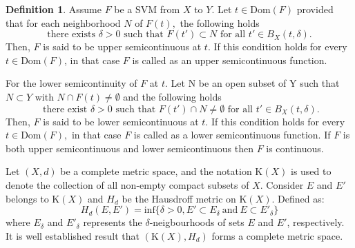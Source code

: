 \documentclass[12pt,oneside,reqno]{amsart}
\theoremstyle{definition}
\newtheorem{definition}[theorem]{Definition}
\theoremstyle{remark}
\begin{document}
 \begin{definition}\cite{Aubin}
 Assume $F $ be a SVM from $X$ to $Y$. Let $t \in \text{Dom}(F)$ provided that for each neighborhood $N$ of $F(t),$ the following holds
 \begin{equation}\label{uppersemi}
 \text{there exists } \delta > 0  \text{ such that } F(t') \subset N \text{ for all } t' \in B_X(t, \delta).
 \end{equation}
 Then, $F$ is said to be upper semicontinuous at $t$. If this condition holds for every $t\in \text{Dom}(F)$, in that case $F$ is called as an upper semicontinuous function.
 
 For the lower semicontinuity of $F$ at $t$. Let N be an open subset of Y such that $N\subset Y$ with $N\cap F(t) \neq \emptyset $ and the following holds 
 \[ \text{ there exist } \delta >0 \text{ such that } F(t') \cap N \neq \emptyset \text{ for all } t' \in B_X(t,\delta). \]
 Then, $F$ is said to be lower semicontinuous at $t$. If this condition holds for every $t\in \text{Dom}(F),$ in that case $F$ is called as a lower semicontinuous function. If $F$ is both upper semicontinuous and lower semicontinuous then $F$ is continuous.

 \end{definition}
 Let $(X,d)$ be a complete metric space, and the notation $\mathrm{K}(X)$ is used to denote the collection of all non-empty compact subsets of $X$. Consider $E$ and $E'$ belongs to $\mathrm{K}(X)$ and $H_d$ be the Hausdroff metric on $\mathrm{K}(X)$. Defined as:
 \[H_d(E,E')=\text{inf}\{\delta>0,E'\subset E_{\delta} ~\text{and}~ E \subset E'_{\delta} \} \]
 where $E_{\delta}$ and $E'_{\delta}$ represents the $\delta$-neigbourhoods of sets $E$ and $E'$, respectively. It is well established result that $(\mathrm{K}(X),H_d)$ forms a complete metric space.
\end{document}
